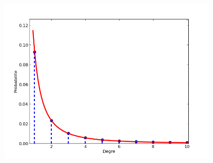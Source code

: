 \documentclass[c]{beamer}
\begin{document}
\begin{frame}
\begin{columns}
\begin{column}{.4\textwidth}
{\begin{figure}
                \end{figure}
                \begin{figure}
                    \includegraphics[width=.9\textwidth]{./figures/degre_power-law.png}
                \end{figure}
            }
        \end{column}
    \end{columns}
\end{frame}
\end{document}
